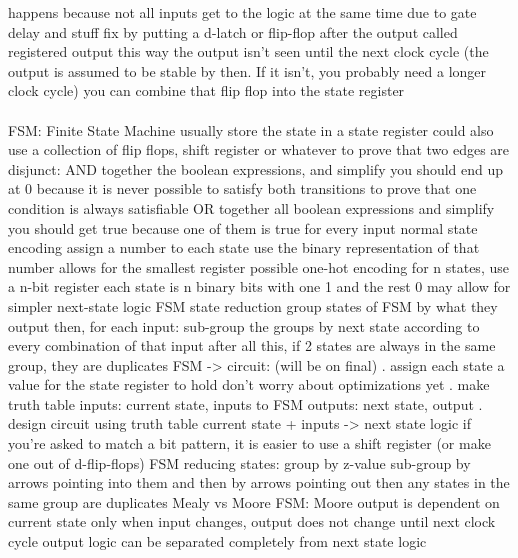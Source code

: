 \documentclass{article}
\begin{document}
\begin{multicols*}{2}
\begin{outline}[compactitem]
\1     happens because not all inputs get to the logic at the same time due to gate delay and stuff
\1     fix by putting a d-latch or flip-flop after the output
\2         called registered output
\2         this way the output isn't seen until the next clock cycle
\2         (the output is assumed to be stable by then. If it isn't, you probably need a longer clock cycle)
\2         you can combine that flip flop into the state register
\noindent \\ 
\noindent \\ 
\0 FSM: Finite State Machine
\1     usually store the state in a state register
\2         could also use a collection of flip flops, shift register or whatever
\1     to prove that two edges are disjunct:
\2         AND together the boolean expressions, and simplify
\2         you should end up at 0 because it is never possible to satisfy both transitions
\1     to prove that one condition is always satisfiable
\2         OR together all boolean expressions and simplify
\3             you should get true because one of them is true for every input
\1     normal state encoding
\2         assign a number to each state
\2         use the binary representation of that number
\2         allows for the smallest register possible
\1     one-hot encoding
\2         for n states, use a n-bit register
\2         each state is n binary bits with one 1 and the rest 0
\2         may allow for simpler next-state logic
\0 FSM state reduction
\1     group states of FSM by what they output
\1     then, for each input:
\2         sub-group the groups by next state according to every combination of that input
\1     after all this, if 2 states are always in the same group, they are duplicates
\0 FSM -> circuit: (will be on final)
. assign each state a value for the state register to hold
\2         don't worry about optimizations yet
. make truth table
\2         inputs:  current state, inputs to FSM
\2         outputs: next state, output
. design circuit using truth table
\2         current state + inputs -> next state logic
\1     if you're asked to match a bit pattern, it is easier to use a shift register
\1     (or make one out of d-flip-flops)
\0 FSM reducing states:
\1     group by z-value
\1     sub-group by arrows pointing into them
\1     and then by arrows pointing out
\1     then any states in the same group are duplicates
\0 Mealy vs Moore FSM:
\1     Moore 
\2         output is dependent on current state only
\3             when input changes, output does not change until next clock cycle
\2         output logic can be separated completely from next state logic

\end{outline}
\end{multicols*}
\end{document}
